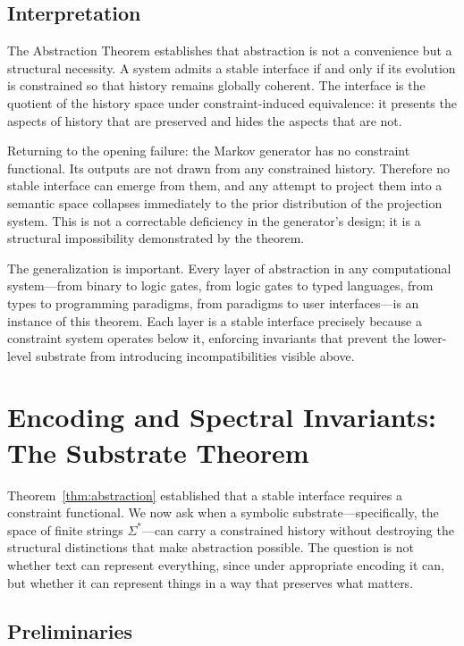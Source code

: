 \documentclass[12pt, a4paper]{article}
\theoremstyle{plain}
\theoremstyle{definition}
\theoremstyle{remark}
\begin{document}
\subsection{Interpretation}

The Abstraction Theorem establishes that abstraction is not a convenience but a structural necessity. A system admits a stable interface if and only if its evolution is constrained so that history remains globally coherent. The interface is the quotient of the history space under constraint-induced equivalence: it presents the aspects of history that are preserved and hides the aspects that are not.

Returning to the opening failure: the Markov generator has no constraint functional. Its outputs are not drawn from any constrained history. Therefore no stable interface can emerge from them, and any attempt to project them into a semantic space collapses immediately to the prior distribution of the projection system. This is not a correctable deficiency in the generator's design; it is a structural impossibility demonstrated by the theorem.

The generalization is important. Every layer of abstraction in any computational system---from binary to logic gates, from logic gates to typed languages, from types to programming paradigms, from paradigms to user interfaces---is an instance of this theorem. Each layer is a stable interface precisely because a constraint system operates below it, enforcing invariants that prevent the lower-level substrate from introducing incompatibilities visible above.

\section{Encoding and Spectral Invariants: The Substrate Theorem}

Theorem~\ref{thm:abstraction} established that a stable interface requires a constraint functional. We now ask when a symbolic substrate---specifically, the space of finite strings $\Sigma^*$---can carry a constrained history without destroying the structural distinctions that make abstraction possible. The question is not whether text can represent everything, since under appropriate encoding it can, but whether it can represent things in a way that preserves what matters.

\subsection{Preliminaries}
\end{document}
